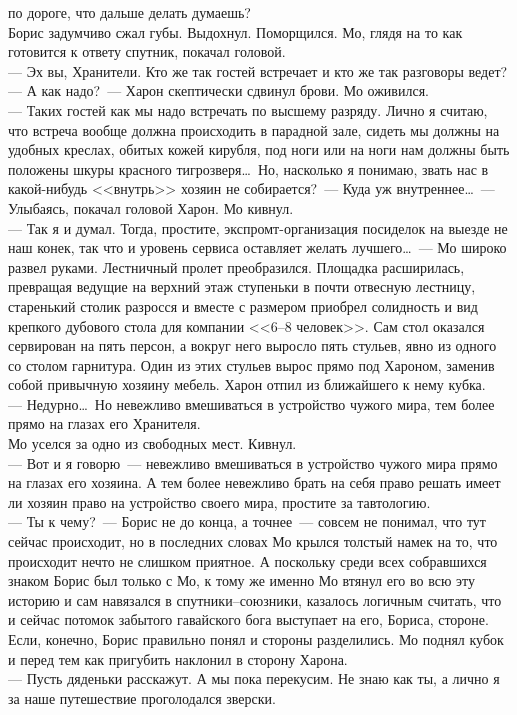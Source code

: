 по дороге, что дальше делать думаешь?\\
Борис задумчиво сжал губы. Выдохнул. Поморщился. Мо, глядя на то как готовится 
к ответу спутник, покачал головой.\\
--- Эх вы, Хранители. Кто же так гостей встречает и кто же так разговоры ведет?\\
--- А как надо?~--- Харон скептически сдвинул брови. Мо оживился.\\
--- Таких гостей как мы надо встречать по высшему разряду. Лично я считаю, что 
встреча вообще должна происходить в парадной зале, сидеть мы должны на удобных 
креслах, обитых кожей кирубля, под ноги или на ноги нам должны быть положены 
шкуры красного тигрозверя\ldots\ Но, насколько я понимаю, звать нас в 
какой-нибудь <<внутрь>> хозяин не собирается?~--- Куда уж внутреннее\ldots~--- Улыбаясь, 
покачал головой Харон. Мо кивнул.\\
--- Так я и думал. Тогда, простите, экспромт-организация посиделок на выезде не 
наш конек, так что и уровень сервиса оставляет желать лучшего\ldots~--- Мо 
широко развел руками. Лестничный пролет преобразился. Площадка расширилась, превращая 
ведущие на верхний этаж ступеньки в почти отвесную лестницу, старенький столик 
разросся и вместе с размером приобрел солидность и вид крепкого дубового стола 
для компании <<6--8 человек>>. Сам стол оказался сервирован на пять персон, а 
вокруг него выросло пять стульев, явно из одного со столом гарнитура. Один из 
этих стульев вырос прямо под Хароном, заменив собой привычную хозяину мебель. 
Харон отпил из ближайшего к нему кубка.\\
--- Недурно\ldots\ Но невежливо вмешиваться в устройство чужого мира, тем более 
прямо на глазах его Хранителя.\\
Мо уселся за одно из свободных мест. Кивнул.\\
--- Вот и я говорю~--- невежливо вмешиваться в устройство чужого мира прямо на 
глазах его хозяина. А тем более невежливо брать на себя право решать имеет ли 
хозяин право на устройство своего мира, простите за тавтологию. \\
--- Ты к чему?~--- Борис не до конца, а точнее~--- совсем не понимал, что тут 
сейчас происходит, но в последних словах Мо крылся толстый намек на то, что происходит 
нечто не слишком приятное. А поскольку среди всех собравшихся знаком Борис был 
только с Мо, к тому же именно Мо втянул его во всю эту историю и сам навязался 
в спутники--союзники, казалось логичным считать, что и сейчас потомок забытого 
гавайского бога выступает на его, Бориса, стороне. Если, конечно, Борис 
правильно понял и стороны разделились. Мо поднял кубок и перед тем как 
пригубить наклонил в сторону Харона.\\
--- Пусть дяденьки расскажут. А мы пока перекусим. Не знаю как ты, а лично я за 
наше путешествие проголодался зверски.

